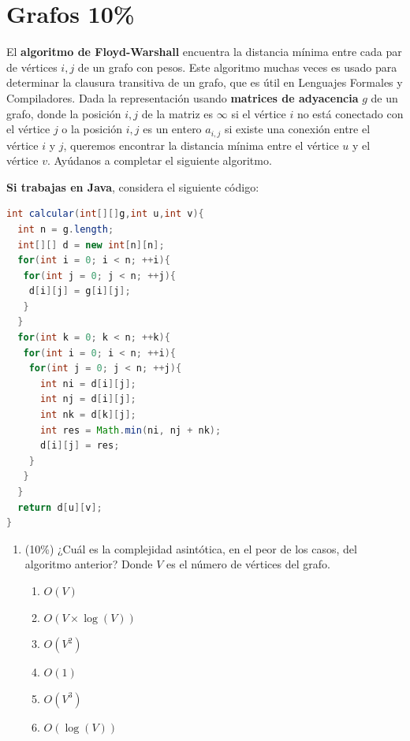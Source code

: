 \documentclass[10 pt]{article}
\begin{document}
\newpage







\section{Grafos 10\%}



El \textbf{algoritmo de Floyd-Warshall} encuentra la distancia mínima entre cada par de vértices $i, j$ de un grafo con pesos. Este algoritmo  muchas veces es usado para determinar la clausura transitiva de un grafo, que es útil en Lenguajes Formales y Compiladores. Dada la representación usando \textbf{matrices de adyacencia} $g$ de un grafo, donde la posición $i, j$ de la matriz es $\infty$ si el vértice $i$ no está conectado con el vértice $j$ o la posición $i, j$ es un entero $a_{i, j}$ si existe una conexión entre el vértice $i$ y $j$, queremos encontrar la distancia mínima entre el vértice $u$ y el vértice $v$. Ayúdanos a completar el siguiente algoritmo.

\hspace{1cm}

\textbf{Si trabajas en Java}, considera el siguiente código:

\begin{lstlisting}[language = java]
int calcular(int[][]g,int u,int v){
  int n = g.length;
  int[][] d = new int[n][n];
  for(int i = 0; i < n; ++i){
   for(int j = 0; j < n; ++j){
    d[i][j] = g[i][j];  
   }   
  }
  for(int k = 0; k < n; ++k){
   for(int i = 0; i < n; ++i){
    for(int j = 0; j < n; ++j){
      int ni = d[i][j];
      int nj = d[i][j];
      int nk = d[k][j];
      int res = Math.min(ni, nj + nk);
      d[i][j] = res;
    } 
   }  
  }
  return d[u][v];
}
\end{lstlisting}

  \begin{enumerate}[label=(\Alph*)]
    \item (10\%) ¿Cuál es la complejidad asintótica, en el peor de los casos, del algoritmo anterior? Donde $V$ es el número de vértices del grafo.
    \begin{enumerate}[label=\roman*)]
      \item $O(V)$
      \item $O(V \times \log(V))$
      \item $O(V^2)$
      \item $O(1)$
      \item $O(V^3)$
      \item $O(\log(V))$
    \end{enumerate}
  \end{enumerate}
\end{document}
